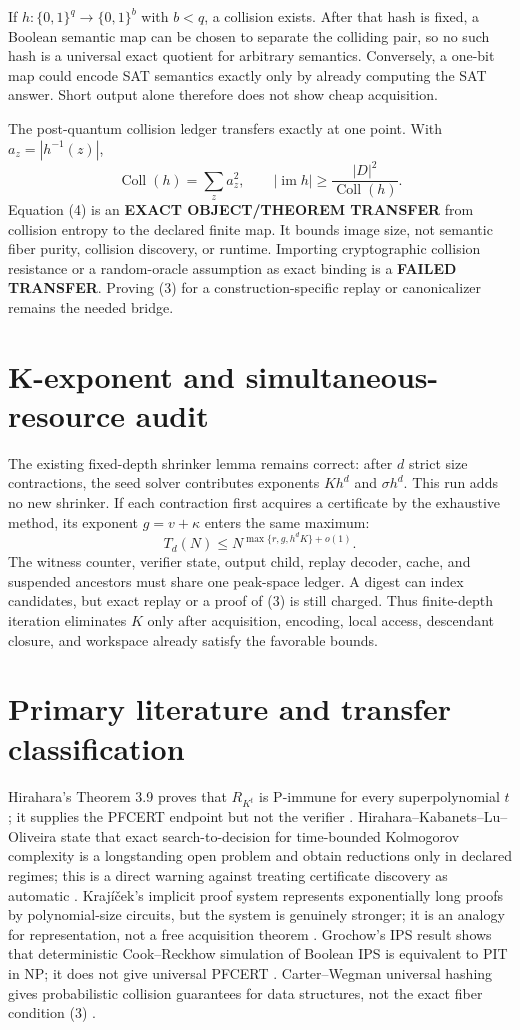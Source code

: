 \documentclass[11pt]{article}
\begin{document}
If $h:\{0,1\}^q\to\{0,1\}^b$ with $b<q$, a collision exists.  After that
hash is fixed, a Boolean semantic map can be chosen to separate the
colliding pair, so no such hash is a universal exact quotient for arbitrary
semantics.  Conversely, a one-bit map could encode SAT semantics exactly
only by already computing the SAT answer.  Short output alone therefore
does not show cheap acquisition.

The post-quantum collision ledger transfers exactly at one point.  With
$a_z=|h^{-1}(z)|$,
\[
 \operatorname{Coll}(h)=\sum_z a_z^2,
 \qquad
 |\operatorname{im}h|\ge
 \frac{|D|^2}{\operatorname{Coll}(h)}.           \tag{4}
\]
Equation (4) is an \textbf{EXACT OBJECT/THEOREM TRANSFER} from collision
entropy to the declared finite map.  It bounds image size, not semantic
fiber purity, collision discovery, or runtime.  Importing cryptographic
collision resistance or a random-oracle assumption as exact binding is a
\textbf{FAILED TRANSFER}.  Proving (3) for a construction-specific replay
or canonicalizer remains the needed bridge.

\section{K-exponent and simultaneous-resource audit}
The existing fixed-depth shrinker lemma remains correct: after $d$ strict
size contractions, the seed solver contributes exponents $Kh^d$ and
$\sigma h^d$.  This run adds no new shrinker.  If each contraction first
acquires a certificate by the exhaustive method, its exponent
$g=v+\kappa$ enters the same maximum:
\[
 T_d(N)\le
 N^{\max\{r,g,h^dK\}+o(1)}.
\]
The witness counter, verifier state, output child, replay decoder, cache,
and suspended ancestors must share one peak-space ledger.  A digest can
index candidates, but exact replay or a proof of (3) is still charged.
Thus finite-depth iteration eliminates $K$ only after acquisition,
encoding, local access, descendant closure, and workspace already satisfy
the favorable bounds.

\section{Primary literature and transfer classification}
Hirahara's Theorem 3.9 proves that $R_{K^t}$ is P-immune for every
superpolynomial $t$; it supplies the PFCERT endpoint but not the verifier
\cite{hirahara2020}.  Hirahara--Kabanets--Lu--Oliveira state that exact
search-to-decision for time-bounded Kolmogorov complexity is a longstanding
open problem and obtain reductions only in declared regimes; this is a
direct warning against treating certificate discovery as automatic
\cite{hklo2024}.  Kraj\'i\v cek's implicit proof system represents
exponentially long proofs by polynomial-size circuits, but the system is
genuinely stronger; it is an analogy for representation, not a free
acquisition theorem \cite{krajicek2003}.  Grochow's IPS result shows that
deterministic Cook--Reckhow simulation of Boolean IPS is equivalent to PIT
in NP; it does not give universal PFCERT \cite{grochow2023}.  Carter--Wegman
universal hashing gives probabilistic collision guarantees for data
structures, not the exact fiber condition (3) \cite{carterwegman1979}.
\end{document}
